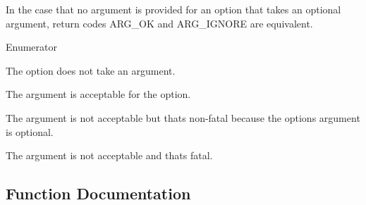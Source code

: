 In the case that no argument is provided for an option that takes an optional argument, return codes {\ttfamily A\+R\+G\+\_\+\+OK} and {\ttfamily A\+R\+G\+\_\+\+I\+G\+N\+O\+RE} are equivalent. \begin{Desc}
\item[Enumerator]\par
\begin{description}
\item[{\em 
A\+R\+G\+\_\+\+N\+O\+NE\hypertarget{namespaceoption_aee8c76a07877335762631491e7a5a1a9a353903b042e8eb0aa2f60c0043a58a7e}{}\label{namespaceoption_aee8c76a07877335762631491e7a5a1a9a353903b042e8eb0aa2f60c0043a58a7e}
}]The option does not take an argument. \item[{\em 
A\+R\+G\+\_\+\+OK\hypertarget{namespaceoption_aee8c76a07877335762631491e7a5a1a9a445e08cb1747e5a22929e7ef2da43b55}{}\label{namespaceoption_aee8c76a07877335762631491e7a5a1a9a445e08cb1747e5a22929e7ef2da43b55}
}]The argument is acceptable for the option. \item[{\em 
A\+R\+G\+\_\+\+I\+G\+N\+O\+RE\hypertarget{namespaceoption_aee8c76a07877335762631491e7a5a1a9a83e0837c79c957525918111d33cab3a9}{}\label{namespaceoption_aee8c76a07877335762631491e7a5a1a9a83e0837c79c957525918111d33cab3a9}
}]The argument is not acceptable but that\textquotesingle{}s non-\/fatal because the option\textquotesingle{}s argument is optional. \item[{\em 
A\+R\+G\+\_\+\+I\+L\+L\+E\+G\+AL\hypertarget{namespaceoption_aee8c76a07877335762631491e7a5a1a9a9528e32563b795bd2930b12d0a5e382d}{}\label{namespaceoption_aee8c76a07877335762631491e7a5a1a9a9528e32563b795bd2930b12d0a5e382d}
}]The argument is not acceptable and that\textquotesingle{}s fatal. \end{description}
\end{Desc}


\subsection{Function Documentation}

